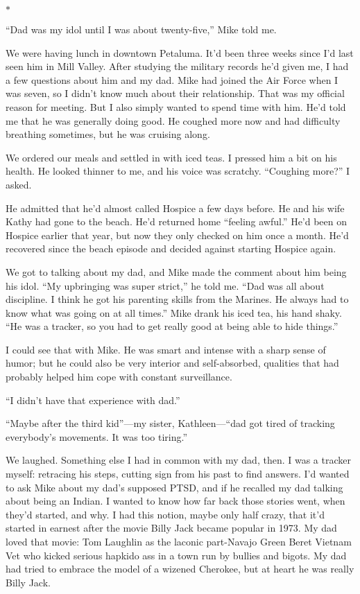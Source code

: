 \documentclass[12pt]{book}
\begin{document}
\begin{center}$*$\end{center}

``Dad was my idol until I was about twenty-five,'' Mike told me.

We were having lunch in downtown Petaluma. It'd been three weeks since I'd last seen him in Mill Valley. After studying the military records he'd given me, I had a few questions about him and my dad. Mike had joined the Air Force when I was seven, so I didn't know much about their relationship. That was my official reason for meeting. But I also simply wanted to spend time with him. He'd told me that he was generally doing good. He coughed more now and had difficulty breathing sometimes, but he was cruising along.

We ordered our meals and settled in with iced teas. I pressed him a bit on his health. He looked thinner to me, and his voice was scratchy. ``Coughing more?'' I asked.

He admitted that he'd almost called Hospice a few days before. He and his wife Kathy had gone to the beach. He'd returned home ``feeling awful.'' He'd been on Hospice earlier that year, but now they only checked on him once a month. He'd recovered since the beach episode and decided against starting Hospice again.

We got to talking about my dad, and Mike made the comment about him being his idol. ``My upbringing was super strict,'' he told me. ``Dad was all about discipline. I think he got his parenting skills from the Marines. He always had to know what was going on at all times.'' Mike drank his iced tea, his hand shaky. ``He was a tracker, so you had to get really good at being able to hide things.''

I could see that with Mike. He was smart and intense with a sharp sense of humor; but he could also be very interior and self-absorbed, qualities that had probably helped him cope with constant surveillance.

``I didn't have that experience with dad.''

``Maybe after the third kid''---my sister, Kathleen---``dad got tired of tracking everybody's movements. It was too tiring.''

We laughed. Something else I had in common with my dad, then. I was a tracker myself: retracing his steps, cutting sign from his past to find answers. I'd wanted to ask Mike about my dad's supposed PTSD, and if he recalled my dad talking about being an Indian. I wanted to know how far back those stories went, when they'd started, and why. I had this notion, maybe only half crazy, that it'd started in earnest after the movie Billy Jack became popular in 1973. My dad loved that movie: Tom Laughlin as the laconic part-Navajo Green Beret Vietnam Vet who kicked serious hapkido ass in a town run by bullies and bigots. My dad had tried to embrace the model of a wizened Cherokee, but at heart he was really Billy Jack.
\end{document}
